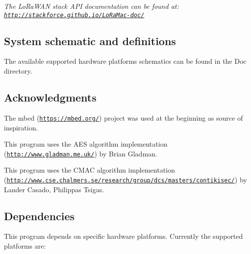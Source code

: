 {\itshape The Lo\+Ra\+W\+AN stack A\+PI documentation can be found at\+: \href{http://stackforce.github.io/LoRaMac-doc/}{\tt http\+://stackforce.\+github.\+io/\+Lo\+Ra\+Mac-\/doc/}}

\subsection*{System schematic and definitions}

The available supported hardware platforms schematics can be found in the Doc directory.

\subsection*{Acknowledgments}

The mbed (\href{https://mbed.org/}{\tt https\+://mbed.\+org/}) project was used at the beginning as source of inspiration.

This program uses the A\+ES algorithm implementation (\href{http://www.gladman.me.uk/}{\tt http\+://www.\+gladman.\+me.\+uk/}) by Brian Gladman.

This program uses the C\+M\+AC algorithm implementation (\href{http://www.cse.chalmers.se/research/group/dcs/masters/contikisec/}{\tt http\+://www.\+cse.\+chalmers.\+se/research/group/dcs/masters/contikisec/}) by Lander Casado, Philippas Tsigas.

\subsection*{Dependencies}

This program depends on specific hardware platforms. Currently the supported platforms are\+:


